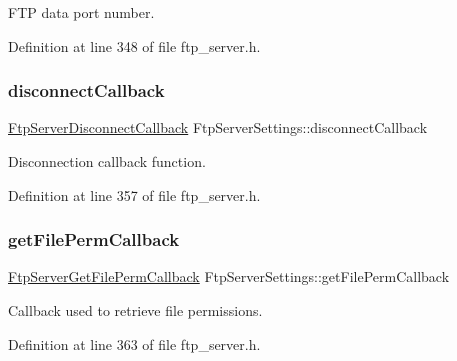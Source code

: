 F\+TP data port number. 



Definition at line 348 of file ftp\+\_\+server.\+h.

\mbox{\label{structFtpServerSettings_a4783ee2799969f290291aa5e7891bb8a}} 
\subsubsection{\texorpdfstring{disconnect\+Callback}{disconnectCallback}}
{\footnotesize\ttfamily \hyperlink{ftp__server_8h_a71c92fb2d972b9f6f519da3cc37ceed6}{Ftp\+Server\+Disconnect\+Callback} Ftp\+Server\+Settings\+::disconnect\+Callback}



Disconnection callback function. 



Definition at line 357 of file ftp\+\_\+server.\+h.

\mbox{\label{structFtpServerSettings_a25ff73d02f8e90eb0536b9560762c3b1}} 
\subsubsection{\texorpdfstring{get\+File\+Perm\+Callback}{getFilePermCallback}}
{\footnotesize\ttfamily \hyperlink{ftp__server_8h_a575fa0bf73715de35a6eabd6e6948f27}{Ftp\+Server\+Get\+File\+Perm\+Callback} Ftp\+Server\+Settings\+::get\+File\+Perm\+Callback}



Callback used to retrieve file permissions. 



Definition at line 363 of file ftp\+\_\+server.\+h.

\mbox{\label{structFtpServerSettings_ad11e10bdc70d2e513c530f93a107e445}} 
